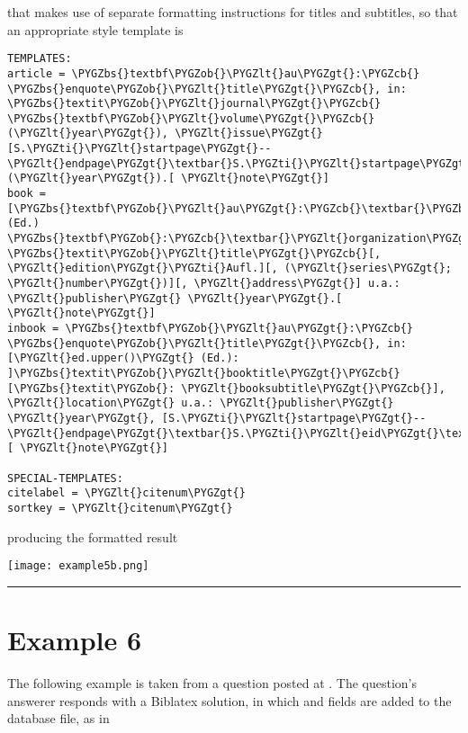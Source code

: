 \documentclass[letterpaper,10pt,english]{sphinxmanual}
\def\PYGZbs{\char`\\}
\def\PYGZob{\char`\{}
\def\PYGZcb{\char`\}}
\def\PYGZlt{\char`\<}
\def\PYGZgt{\char`\>}
\def\PYGZti{\char`\~}
\begin{document}
that makes use of separate formatting instructions for titles and subtitles, so that an appropriate style template is

\begin{Verbatim}[commandchars=\\\{\}]
TEMPLATES:
article = \PYGZbs{}textbf\PYGZob{}\PYGZlt{}au\PYGZgt{}:\PYGZcb{} \PYGZbs{}enquote\PYGZob{}\PYGZlt{}title\PYGZgt{}\PYGZcb{}, in: \PYGZbs{}textit\PYGZob{}\PYGZlt{}journal\PYGZgt{}\PYGZcb{} \PYGZbs{}textbf\PYGZob{}\PYGZlt{}volume\PYGZgt{}\PYGZcb{} (\PYGZlt{}year\PYGZgt{}), \PYGZlt{}issue\PYGZgt{} [S.\PYGZti{}\PYGZlt{}startpage\PYGZgt{}--\PYGZlt{}endpage\PYGZgt{}\textbar{}S.\PYGZti{}\PYGZlt{}startpage\PYGZgt{}\textbar{}\PYGZlt{}eid\PYGZgt{}\textbar{}] (\PYGZlt{}year\PYGZgt{}).[ \PYGZlt{}note\PYGZgt{}]
book = [\PYGZbs{}textbf\PYGZob{}\PYGZlt{}au\PYGZgt{}:\PYGZcb{}\textbar{}\PYGZbs{}textbf\PYGZob{}\PYGZlt{}ed\PYGZgt{}\PYGZcb{} (Ed.) \PYGZbs{}textbf\PYGZob{}:\PYGZcb{}\textbar{}\PYGZlt{}organization\PYGZgt{}\textbar{}\PYGZlt{}institution\PYGZgt{}\textbar{}], \PYGZbs{}textit\PYGZob{}\PYGZlt{}title\PYGZgt{}\PYGZcb{}[, \PYGZlt{}edition\PYGZgt{}\PYGZti{}Aufl.][, (\PYGZlt{}series\PYGZgt{}; \PYGZlt{}number\PYGZgt{})][, \PYGZlt{}address\PYGZgt{}] u.a.: \PYGZlt{}publisher\PYGZgt{} \PYGZlt{}year\PYGZgt{}.[ \PYGZlt{}note\PYGZgt{}]
inbook = \PYGZbs{}textbf\PYGZob{}\PYGZlt{}au\PYGZgt{}:\PYGZcb{} \PYGZbs{}enquote\PYGZob{}\PYGZlt{}title\PYGZgt{}\PYGZcb{}, in: [\PYGZlt{}ed.upper()\PYGZgt{} (Ed.): ]\PYGZbs{}textit\PYGZob{}\PYGZlt{}booktitle\PYGZgt{}\PYGZcb{}[\PYGZbs{}textit\PYGZob{}: \PYGZlt{}booksubtitle\PYGZgt{}\PYGZcb{}], \PYGZlt{}location\PYGZgt{} u.a.: \PYGZlt{}publisher\PYGZgt{} \PYGZlt{}year\PYGZgt{}, [S.\PYGZti{}\PYGZlt{}startpage\PYGZgt{}--\PYGZlt{}endpage\PYGZgt{}\textbar{}S.\PYGZti{}\PYGZlt{}eid\PYGZgt{}\textbar{}].[ \PYGZlt{}note\PYGZgt{}]

SPECIAL-TEMPLATES:
citelabel = \PYGZlt{}citenum\PYGZgt{}
sortkey = \PYGZlt{}citenum\PYGZgt{}
\end{Verbatim}

producing the formatted result

\texttt{[image: example5b.png]}


\bigskip\hrule{}\bigskip



\section{Example 6}
\label{examples:example-6}
The following example is taken from a question posted at . The question's answerer responds with a Biblatex solution, in which  and  fields are added to the  database file, as in
\end{document}
